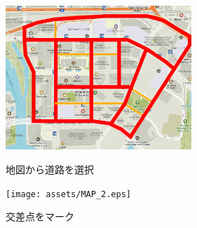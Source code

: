 \begin{figure}[htbp]
    \begin{minipage}{0.5\hsize}
        \begin{center}
            \includegraphics[width=70mm]{assets/MAP_1.eps}
        \end{center}
        \caption{地図から道路を選択}
        \label{fig:one}
    \end{minipage}
    \begin{minipage}{0.5\hsize}
        \begin{center}
            \texttt{[image: assets/MAP\_2.eps]}
        \end{center}
        \caption{交差点をマーク}
        \label{fig:two}
    \end{minipage}
\end{figure}



